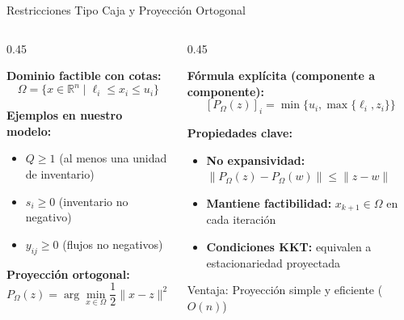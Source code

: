 \documentclass[
  ignorenonframetext,
]{beamer}
\begin{document}
\begin{frame}{Restricciones Tipo Caja y Proyección Ortogonal}
\label{restricciones-tipo-caja-y-proyecciuxf3n-ortogonal}
\begin{columns}[T]
\begin{column}{0.45\linewidth}
\justifying

\textbf{Dominio factible con cotas:}
\[\Omega = \{x \in \mathbb{R}^n \mid \ell_i \leq x_i \leq u_i\}\]

\textbf{Ejemplos en nuestro modelo:}

\begin{itemize}
\item $Q \geq 1$ (al menos una unidad de inventario)
\item $s_i \geq 0$ (inventario no negativo)
\item $y_{ij} \geq 0$ (flujos no negativos)
\end{itemize}

\vspace{0.3cm}

\textbf{Proyección ortogonal:}
\[P_\Omega(z) = \arg\min_{x \in \Omega} \frac{1}{2}\|x - z\|^2\]
\end{column}

\begin{column}{0.45\linewidth}
\justifying

\textbf{Fórmula explícita (componente a componente):}
\[[P_\Omega(z)]_i = \min\{u_i, \max\{\ell_i, z_i\}\}\]

\textbf{Propiedades clave:}

\begin{itemize}
\item \textbf{No expansividad:} $\|P_\Omega(z) - P_\Omega(w)\| \leq \|z-w\|$
\item \textbf{Mantiene factibilidad:} $x_{k+1} \in \Omega$ en cada iteración
\item \textbf{Condiciones KKT:} equivalen a estacionariedad proyectada
\end{itemize}

\vspace{0.3cm}

\alert{Ventaja:} Proyección simple y eficiente (\(O(n)\))
\end{column}
\end{columns}
\end{frame}
\end{document}
